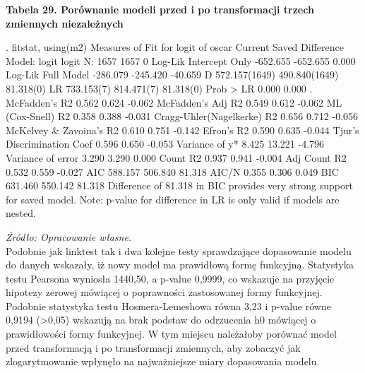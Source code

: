\vspace{0.5cm}
\textbf{Tabela 29. Porównanie modeli przed i po transformacji trzech zmiennych niezależnych}
\begin{stlog}
. fitstat, using(m2) 
Measures of Fit for logit of oscar
{\smallskip}
                               Current             Saved        Difference
Model:                           logit             logit
N:                                1657              1657                 0
Log-Lik Intercept Only        -652.655          -652.655             0.000
Log-Lik Full Model            -286.079          -245.420           -40.659
D                              572.157(1649)     490.840(1649)      81.318(0)
LR                             733.153(7)        814.471(7)         81.318(0)
Prob > LR                        0.000             0.000                 .
McFadden's R2                    0.562             0.624            -0.062
McFadden's Adj R2                0.549             0.612            -0.062
ML (Cox-Snell) R2                0.358             0.388            -0.031
Cragg-Uhler(Nagelkerke) R2       0.656             0.712            -0.056
McKelvey \& Zavoina's R2          0.610             0.751            -0.142
Efron's R2                       0.590             0.635            -0.044
Tjur's Discrimination Coef       0.596             0.650            -0.053
Variance of y*                   8.425            13.221            -4.796
Variance of error                3.290             3.290             0.000
Count R2                         0.937             0.941            -0.004
Adj Count R2                     0.532             0.559            -0.027
AIC                            588.157           506.840            81.318
AIC/N                            0.355             0.306             0.049
BIC                            631.460           550.142            81.318
{\smallskip}
Difference of   81.318 in BIC provides very strong support for saved model.
{\smallskip}
Note: p-value for difference in LR is only valid if models are nested.
\end{stlog}
\textit{\footnotesize{Źródło: Opracowanie własne.}} \\

Podobnie jak linktest tak i dwa kolejne testy sprawdzające dopasowanie modelu do danych wskazały, iż nowy model ma prawidłową formę funkcyjną.  Statystyka testu Pearsona wyniosła 1440,50, a p-value 0,9999, co wskazuje na przyjęcie hipotezy zerowej mówiącej o poprawności zastosowanej formy funkcyjnej. Podobnie statystyka testu  Hosmera-Lemeshowa równa 3,23 i p-value równe 0,9194 (>0,05) wskazują na brak podstaw do odrzucenia h0 mówiącej o prawidłowości formy funkcyjnej. W tym miejscu należałoby porównać model przed transformacją i po transformacji zmiennych, aby zobaczyć jak zlogarytmowanie wpłynęło na najważniejsze miary dopasowania modelu.

